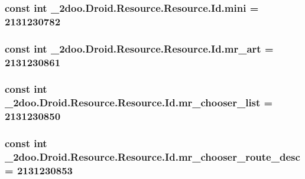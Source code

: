 \hypertarget{class__2doo_1_1_droid_1_1_resource_1_1_id_679f84dd4cb0b08295d83cce3e5c9b90}{
\subsubsection[{mini}]{\setlength{\rightskip}{0pt plus 5cm}const int \_\-2doo.Droid.Resource.Resource.Id.mini = 2131230782}}
\label{class__2doo_1_1_droid_1_1_resource_1_1_id_679f84dd4cb0b08295d83cce3e5c9b90}


\hypertarget{class__2doo_1_1_droid_1_1_resource_1_1_id_541f56d850fd836e7ef83248bd974554}{
\subsubsection[{mr\_\-art}]{\setlength{\rightskip}{0pt plus 5cm}const int \_\-2doo.Droid.Resource.Resource.Id.mr\_\-art = 2131230861}}
\label{class__2doo_1_1_droid_1_1_resource_1_1_id_541f56d850fd836e7ef83248bd974554}


\hypertarget{class__2doo_1_1_droid_1_1_resource_1_1_id_e66f3fee5792293944e15fc44b0d804c}{
\subsubsection[{mr\_\-chooser\_\-list}]{\setlength{\rightskip}{0pt plus 5cm}const int \_\-2doo.Droid.Resource.Resource.Id.mr\_\-chooser\_\-list = 2131230850}}
\label{class__2doo_1_1_droid_1_1_resource_1_1_id_e66f3fee5792293944e15fc44b0d804c}


\hypertarget{class__2doo_1_1_droid_1_1_resource_1_1_id_e87b9f6bddf9edaabd979ac7eaa46728}{
\subsubsection[{mr\_\-chooser\_\-route\_\-desc}]{\setlength{\rightskip}{0pt plus 5cm}const int \_\-2doo.Droid.Resource.Resource.Id.mr\_\-chooser\_\-route\_\-desc = 2131230853}}
\label{class__2doo_1_1_droid_1_1_resource_1_1_id_e87b9f6bddf9edaabd979ac7eaa46728}


